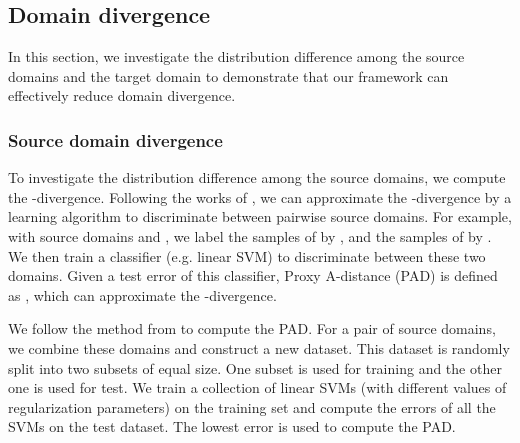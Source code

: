 \documentclass{article}
\begin{document}
\subsection{Domain divergence}
\label{divergence}

In this section, we investigate the distribution difference among the source domains and the target domain to demonstrate that our framework can effectively reduce domain divergence.

\subsubsection{Source domain divergence}
\label{divergence_src}

To investigate the distribution difference among the source domains, we compute the -divergence. Following the works of \cite{ben2007analysis,ben2010theory}, we can approximate the -divergence by a learning algorithm to discriminate between pairwise source domains. For example, with source domains  and , we label the samples of  by , and the samples of  by . We then train a classifier (e.g. linear SVM) to discriminate between these two domains. Given a test error  of this classifier, Proxy A-distance (PAD) is defined as , which can approximate the -divergence.

We follow the method from \cite{glorot2011domain,chen2012marginalized,ajakan2014domain} to compute the PAD. For a pair of source domains, we combine these domains and construct a new dataset. This dataset is randomly split into two subsets of equal size. One subset is used for training and the other one is used for test. We train a collection of linear SVMs (with different values of regularization parameters) on the training set and compute the errors  of all the SVMs on the test dataset. The lowest error  is used to compute the PAD.
\end{document}
